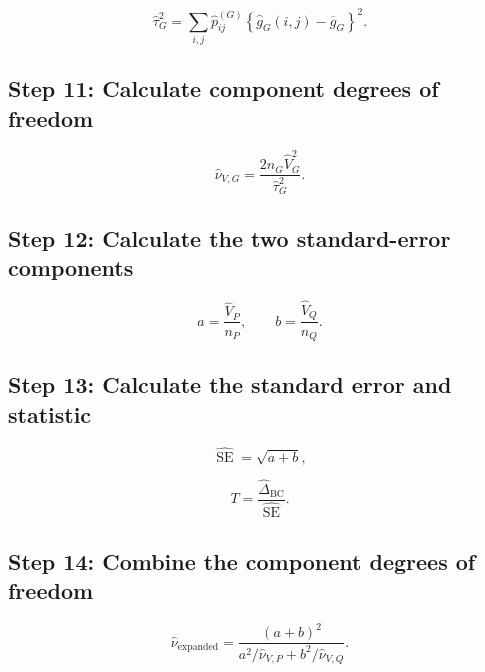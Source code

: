 \documentclass[
  11pt]{article}
\begin{document}
\begin{equation}
\widehat\tau_G^2
=\sum_{i,j}\widehat p^{(G)}_{ij}
\left\{\widehat g_G(i,j)-\overline g_G\right\}^2.
\end{equation}

\subsection{Step 11: Calculate component degrees of
freedom}\label{step-11-calculate-component-degrees-of-freedom}

\begin{equation}
\widehat\nu_{V,G}
=\frac{2n_G\widehat V_G^2}{\widehat\tau_G^2}.
\end{equation}

\subsection{Step 12: Calculate the two standard-error
components}\label{step-12-calculate-the-two-standard-error-components}

\begin{equation}
a=\frac{\widehat V_P}{n_P},
\qquad
b=\frac{\widehat V_Q}{n_Q}.
\end{equation}

\subsection{Step 13: Calculate the standard error and
statistic}\label{step-13-calculate-the-standard-error-and-statistic}

\begin{equation}
\widehat{\operatorname{SE}}=\sqrt{a+b},
\end{equation}

\begin{equation}
T=\frac{\widehat\Delta_{\mathrm{BC}}}
{\widehat{\operatorname{SE}}}.
\end{equation}

\subsection{Step 14: Combine the component degrees of
freedom}\label{step-14-combine-the-component-degrees-of-freedom}

\begin{equation}
\widehat\nu_{\mathrm{expanded}}
=\frac{(a+b)^2}
{a^2/\widehat\nu_{V,P}
+b^2/\widehat\nu_{V,Q}}.
\end{equation}
\end{document}
